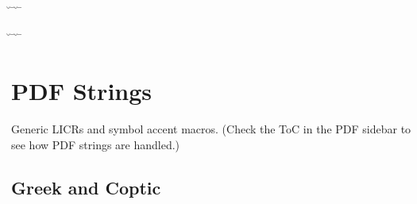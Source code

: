 \documentclass[a4paper]{scrartcl}
\begin{document}
\begin{minipage}{0.48\linewidth}
{\u\iota{}
\=\iota{}
\accdialytikavaria\iota{}
\accdialytikatonos\iota{}
\accperispomeni\iota{}
\accdialytikaperispomeni\iota{}
\u\Iota{}
\=\Iota{}
\accvaria\Iota{}
\accoxia\Iota{}
\accdasiavaria{}
\accdasiaoxia{}
\accdasiaperispomeni{}

\u\upsilon{}
\=\upsilon{}
\accdialytikavaria\upsilon{}
\accdialytikatonos\upsilon{}
\accpsili\rho{}
\accdasia\rho{}
\accperispomeni\upsilon{}
\accdialytikaperispomeni\upsilon{}
\u\Upsilon{}
\=\Upsilon{}
\accvaria\Upsilon{}
\accoxia\Upsilon{}
\accdasia\Rho{}
\accdialytikavaria{}
\accdialytikatonos{}
\accvaria{}

\accvaria\omega\ypogegrammeni{}
\omega\ypogegrammeni{}
\accoxia\omega\ypogegrammeni{}
\accperispomeni\omega{}
\accperispomeni\omega\ypogegrammeni{}
\accvaria\Omicron{}
\accoxia\Omicron{}
\accvaria\Omega{}
\accoxia\Omega{}
\Omega\ypogegrammeni{}
\accoxia{}
\accdasia{}
} %
\end{minipage}

\section{PDF Strings}

Generic LICRs and symbol accent macros.
(Check the ToC in the PDF sidebar to see how PDF strings are handled.)

\subsection{Greek and Coptic}

\subsubsection{\GreekAndCopticI}
\subsubsection{\GreekAndCopticII}
\subsubsection{\GreekAndCopticIII}
\subsubsection{\GreekAndCopticIV}
\subsubsection{\GreekAndCopticV}
\subsubsection{\GreekAndCopticVI}
\end{document}

